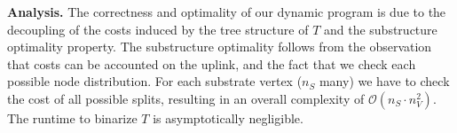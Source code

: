 \documentclass[9pt]{sigcomm-alternate}
\newcommand{\SubstrateNodes}{\ensuremath{V_S}}
\newcommand{\SubstrateNode}{\ensuremath{v}}
\newcommand{\Opt}{\ensuremath{Opt}}
\newcommand{\Uplink}{\ensuremath{\textsc{uplink}}}
\newcommand{\ChunkCount}{\ensuremath{\textsc{cis}}}
\newcommand{\capacity}{\emph{cap}}
\newcommand{\Tree}{\ensuremath{T}}
\newcommand{\CostTrans}{\ensuremath{b_1}}
\newcommand{\CostCom}{\ensuremath{b_2}}
\newcommand{\Vms}{\ensuremath{n_V}}
\begin{document}

\textbf{Analysis.}
The correctness and optimality of our dynamic program
is due to the decoupling of the costs induced by the tree
structure of $\Tree$ and the  substructure
optimality property.
The substructure optimality follows from the observation that
costs can be accounted on the uplink, and the fact
 that we check each possible node distribution.
For each substrate vertex ($n_S$ many) we have
to check the cost of all possible splits,
resulting in an overall complexity of $\mathcal{O}(n_S \cdot n_V^2)$.
The runtime to binarize $\Tree$ is asymptotically negligible.
\end{document}
